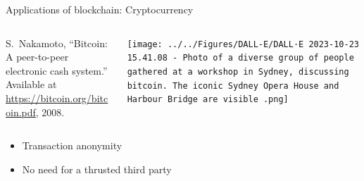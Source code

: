 \documentclass{beamer}
\begin{document}
\begin{frame}{Applications of blockchain: Cryptocurrency}
\begin{columns}
\begin{column}{0.5\textwidth}
   
{\footnotesize
\begin{thebibliography}{1}
S.~Nakamoto, ``Bitcoin: A peer-to-peer electronic cash system.'' Available at
  \href{https://bitcoin.org/bitcoin.pdf}{https://bitcoin.org/bitcoin.pdf},
  2008.
\end{thebibliography}  
}
\end{column}
\begin{column}{0.5\textwidth}  %
    \begin{center}
     \texttt{[image: ../../Figures/DALL-E/DALL·E 2023-10-23 15.41.08 - Photo of a diverse group of people gathered at a workshop in Sydney, discussing bitcoin. The iconic Sydney Opera House and Harbour Bridge are visible .png]}
     \end{center}
\end{column}
\end{columns}

\begin{itemize}
  \item Transaction anonymity
  \item No need for a thrusted third party
\end{itemize}
\end{frame}
\end{document}
